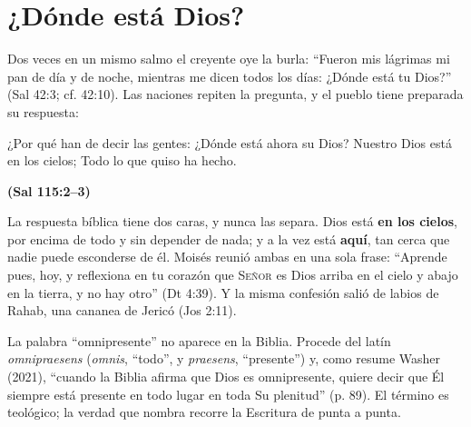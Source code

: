 \documentclass[11pt,letterpaper]{article}
\newcommand{\SENOR}{\textsc{Señor}}
\newcommand{\fuente}[1]{\par\hfill{\upshape\bfseries\small\textcolor{azul}{#1}}}
\newcommand{\destacar}[1]{\textbf{\textcolor{azul}{#1}}}
\begin{document}
\section{¿Dónde está Dios?}

Dos veces en un mismo salmo el creyente oye la burla: ``Fueron mis lágrimas mi pan de día y de noche, mientras me dicen todos los días: ¿Dónde está tu Dios?'' (Sal 42:3; cf. 42:10). Las naciones repiten la pregunta, y el pueblo tiene preparada su respuesta:

\begin{cita}¿Por qué han de decir las gentes: ¿Dónde está ahora su Dios? Nuestro Dios está en los cielos; Todo lo que quiso ha hecho.\fuente{(Sal 115:2--3)}\end{cita}

La respuesta bíblica tiene dos caras, y nunca las separa. Dios está \destacar{en los cielos}, por encima de todo y sin depender de nada; y a la vez está \destacar{aquí}, tan cerca que nadie puede esconderse de él. Moisés reunió ambas en una sola frase: ``Aprende pues, hoy, y reflexiona en tu corazón que \SENOR{} es Dios arriba en el cielo y abajo en la tierra, y no hay otro'' (Dt 4:39). Y la misma confesión salió de labios de Rahab, una cananea de Jericó (Jos 2:11).

La palabra ``omnipresente'' no aparece en la Biblia. Procede del latín \emph{omnipraesens} (\emph{omnis}, ``todo'', y \emph{praesens}, ``presente'') y, como resume Washer (2021), ``cuando la Biblia afirma que Dios es omnipresente, quiere decir que Él siempre está presente en todo lugar en toda Su plenitud'' (p. 89). El término es teológico; la verdad que nombra recorre la Escritura de punta a punta.
\end{document}
